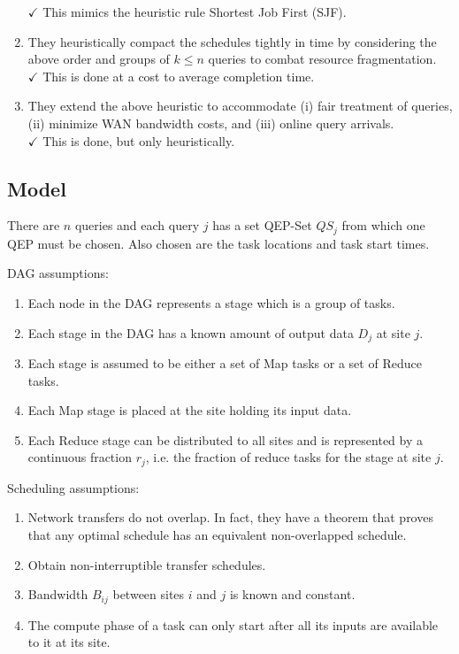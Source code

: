 \begin{enumerate}
	$\checkmark$ This mimics the heuristic rule Shortest Job First (SJF).
	\item They heuristically compact the schedules tightly in time by considering the above order and groups of $k\leq n$ queries to combat resource fragmentation. \\
	$\checkmark$ This is done at a cost to average completion time.
	\item They extend the above heuristic to accommodate (i) fair treatment of queries, (ii) minimize WAN bandwidth costs, and (iii) online query arrivals. \\
	$\checkmark$ This is done, but only heuristically.
\end{enumerate}

\subsection{Model}
There are $n$ queries and each query $j$ has a set QEP-Set $QS_j$ from which one QEP must be chosen.
Also chosen are the task locations and task start times.

DAG assumptions:
\begin{enumerate}
	\item Each node in the DAG represents a stage which is a group of tasks.
	\item Each stage in the DAG has a known amount of output data $D_j$ at site $j$.
	\item Each stage is assumed to be either a set of Map tasks or a set of Reduce tasks.
	\item Each Map stage is placed at the site holding its input data.
	\item Each Reduce stage can be distributed to all sites and is represented by a continuous fraction $r_j$, i.e. the fraction of reduce tasks for the stage at site $j$.
\end{enumerate}

Scheduling assumptions:
\begin{enumerate}
	\item Network transfers do not overlap.
	In fact, they have a theorem that proves that any optimal schedule has an equivalent non-overlapped schedule.
	\item Obtain non-interruptible transfer schedules.
	\item Bandwidth $B_{ij}$ between sites $i$ and $j$ is known and constant.
	\item The compute phase of a task can only start after all its inputs are available to it at its site.
\end{enumerate}

